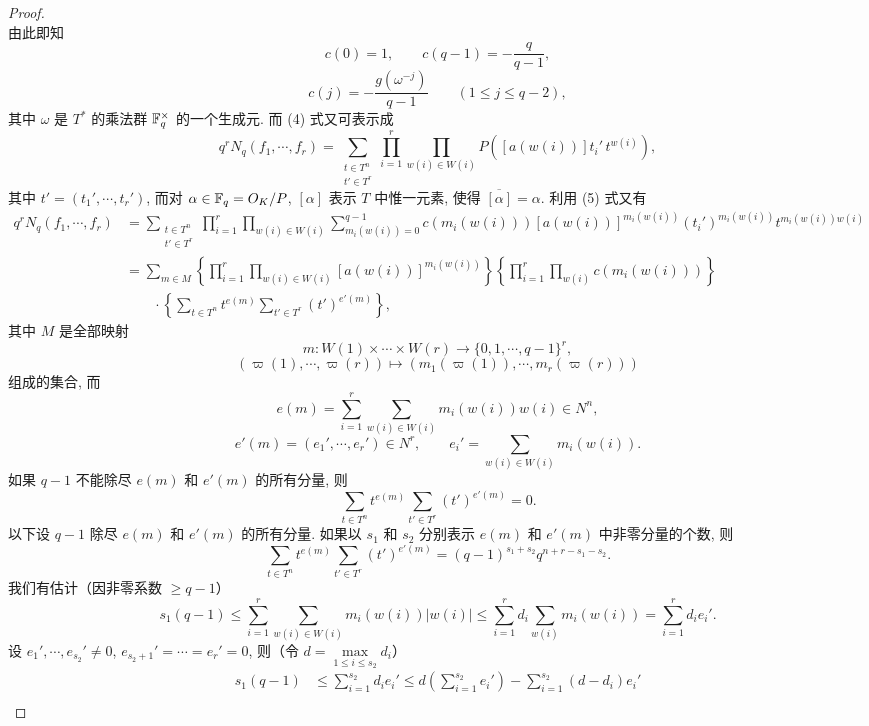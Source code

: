 \begin{proof}
\[\]
由此即知
\[
  c(0)=1,\qquad c(q-1)=-\frac{q}{q-1},
\]
\begin{equation}\tag{6}
  c(j)=-\frac{g(\omega^{-j})}{q-1}\qquad(1\leqslant j\leqslant q-2),
\end{equation}
其中 $\omega$ 是 $T^*$ 的乘法群 $\mathbb{F}_q^{\times}$ 的一个生成元. 而 (4) 式又可表示成
\[
  q^rN_q(f_1,\cdots,f_r)
  =\sum_{\substack{t\in T^n\\ t'\in T^r}}
  \prod_{i=1}^{r}\prod_{w(i)\in W(i)}
  P\left([a(w(i))]t_i'\,t^{w(i)}\right),
\]
其中 $t'=(t_1',\cdots,t_r')$, 而对 $\alpha\in\mathbb{F}_q=O_K/P$, $[\alpha]$ 表示 $T$ 中惟一元素, 使得 $\overline{[\alpha]}=\alpha$. 利用 (5) 式又有
\begin{align}
  q^rN_q(f_1,\cdots,f_r)&=\sum_{\substack{t\in T^n\\ t'\in T^r}}
  \prod_{i=1}^{r}\prod_{w(i)\in W(i)}
  \sum_{m_i(w(i))=0}^{q-1}c(m_i(w(i)))
  [a(w(i))]^{m_i(w(i))}(t_i')^{m_i(w(i))}t^{m_i(w(i))w(i)}\nonumber\\
  &=\sum_{m\in M}\left\{\prod_{i=1}^{r}\prod_{w(i)\in W(i)}
  [a(w(i))]^{m_i(w(i))}\right\}
  \left\{\prod_{i=1}^{r}\prod_{w(i)}c(m_i(w(i)))\right\}\nonumber\\
  &\qquad\cdot\left\{\sum_{t\in T^n}t^{e(m)}\sum_{t'\in T^r}(t')^{e'(m)}\right\},\tag{7}
\end{align}
其中 $M$ 是全部映射
\[
  m\colon W(1)\times\cdots\times W(r)\to\{0,1,\cdots,q-1\}^r,
\]
\[
  (\varpi(1),\cdots,\varpi(r))\mapsto(m_1(\varpi(1)),\cdots,m_r(\varpi(r)))
\]
组成的集合, 而
\[
  e(m)=\sum_{i=1}^{r}\sum_{w(i)\in W(i)}m_i(w(i))w(i)\in N^n,
\]
\[
  e'(m)=(e_1',\cdots,e_r')\in N^r,\qquad
  e_i'=\sum_{w(i)\in W(i)}m_i(w(i)).
\]
如果 $q-1$ 不能除尽 $e(m)$ 和 $e'(m)$ 的所有分量, 则
\[
  \sum_{t\in T^n}t^{e(m)}\sum_{t'\in T^r}(t')^{e'(m)}=0.
\]
以下设 $q-1$ 除尽 $e(m)$ 和 $e'(m)$ 的所有分量. 如果以 $s_1$ 和 $s_2$ 分别表示 $e(m)$ 和 $e'(m)$ 中非零分量的个数, 则
\begin{equation}\tag{8}
  \sum_{t\in T^n}t^{e(m)}\sum_{t'\in T^r}(t')^{e'(m)}
  =(q-1)^{s_1+s_2}q^{n+r-s_1-s_2}.
\end{equation}
我们有估计（因非零系数 $\geqslant q-1$）
\[
  s_1(q-1)\leqslant\sum_{i=1}^{r}\sum_{w(i)\in W(i)}m_i(w(i))|w(i)|
  \leqslant\sum_{i=1}^{r}d_i\sum_{w(i)}m_i(w(i))
  =\sum_{i=1}^{r}d_ie_i'.
\]
设 $e_1',\cdots,e_{s_2}'\neq 0$, $e_{s_2+1}'=\cdots=e_r'=0$, 则（令 $d=\max\limits_{1\leqslant i\leqslant s_2}d_i$）
\begin{align*}
  s_1(q-1)&\leqslant\sum_{i=1}^{s_2}d_ie_i'
  \leqslant d\left(\sum_{i=1}^{s_2}e_i'\right)-\sum_{i=1}^{s_2}(d-d_i)e_i'\\

\end{align*}
\end{proof}
